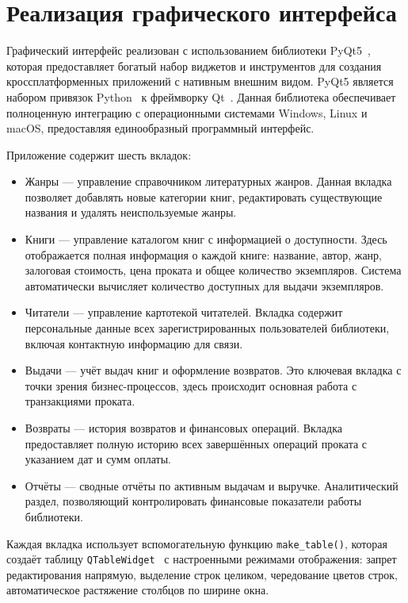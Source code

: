 \documentclass[14pt]{extreport}
\begin{document}
	
	\chapter{Реализация графического интерфейса}

	Графический интерфейс реализован с использованием библиотеки PyQt5~\cite{bib5}, которая предоставляет богатый набор виджетов и инструментов для создания кроссплатформенных приложений с нативным внешним видом. PyQt5 является набором привязок Python~\cite{bib6} к фреймворку Qt~\cite{bib7}. Данная библиотека обеспечивает полноценную интеграцию с операционными системами Windows, Linux и macOS, предоставляя единообразный программный интерфейс.
	
	Приложение содержит шесть вкладок:
	\begin{itemize}
		\item Жанры --- управление справочником литературных жанров. Данная вкладка позволяет добавлять новые категории книг, редактировать существующие названия и удалять неиспользуемые жанры.
		\item Книги --- управление каталогом книг с информацией о доступности. Здесь отображается полная информация о каждой книге: название, автор, жанр, залоговая стоимость, цена проката и общее количество экземпляров. Система автоматически вычисляет количество доступных для выдачи экземпляров.
		\item Читатели --- управление картотекой читателей. Вкладка содержит персональные данные всех зарегистрированных пользователей библиотеки, включая контактную информацию для связи.
		\item Выдачи --- учёт выдач книг и оформление возвратов. Это ключевая вкладка с точки зрения бизнес-процессов, здесь происходит основная работа с транзакциями проката.
		\item Возвраты --- история возвратов и финансовых операций. Вкладка предоставляет полную историю всех завершённых операций проката с указанием дат и сумм оплаты.
		\item Отчёты --- сводные отчёты по активным выдачам и выручке. Аналитический раздел, позволяющий контролировать финансовые показатели работы библиотеки.
	\end{itemize}
	
	Каждая вкладка использует вспомогательную функцию \texttt{make\_table()}, которая создаёт таблицу \texttt{QTableWidget}~\cite{bib5} с настроенными режимами отображения: запрет редактирования напрямую, выделение строк целиком, чередование цветов строк, автоматическое растяжение столбцов по ширине окна.
	
\end{document}
